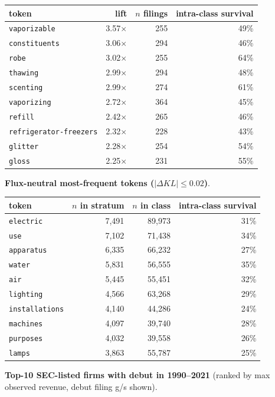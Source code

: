 \begin{tabular}{lrrr}
\toprule
token & lift & $n$ filings & intra-class survival \\
\midrule
\texttt{vaporizable} & 3.57$\times$ & 255 & 49\% \\
\texttt{constituents} & 3.06$\times$ & 294 & 46\% \\
\texttt{robe} & 3.02$\times$ & 255 & 64\% \\
\texttt{thawing} & 2.99$\times$ & 294 & 48\% \\
\texttt{scenting} & 2.99$\times$ & 274 & 61\% \\
\texttt{vaporizing} & 2.72$\times$ & 364 & 45\% \\
\texttt{refill} & 2.42$\times$ & 265 & 46\% \\
\texttt{refrigerator-freezers} & 2.32$\times$ & 228 & 43\% \\
\texttt{glitter} & 2.28$\times$ & 254 & 54\% \\
\texttt{gloss} & 2.25$\times$ & 231 & 55\% \\
\bottomrule
\end{tabular}

\textbf{Flux-neutral most-frequent tokens ($|\Delta KL|\leq 0.02$)}.

\begin{tabular}{lrrr}
\toprule
token & $n$ in stratum & $n$ in class & intra-class survival \\
\midrule
\texttt{electric} & 7,491 & 89,973 & 31\% \\
\texttt{use} & 7,102 & 71,438 & 34\% \\
\texttt{apparatus} & 6,335 & 66,232 & 27\% \\
\texttt{water} & 5,831 & 56,555 & 35\% \\
\texttt{air} & 5,445 & 55,451 & 32\% \\
\texttt{lighting} & 4,566 & 63,268 & 29\% \\
\texttt{installations} & 4,140 & 44,286 & 24\% \\
\texttt{machines} & 4,097 & 39,740 & 28\% \\
\texttt{purposes} & 4,032 & 39,558 & 26\% \\
\texttt{lamps} & 3,863 & 55,787 & 25\% \\
\bottomrule
\end{tabular}

\textbf{Top-10 SEC-listed firms with debut in 1990--2021} (ranked by max observed revenue, debut filing g/s shown).

